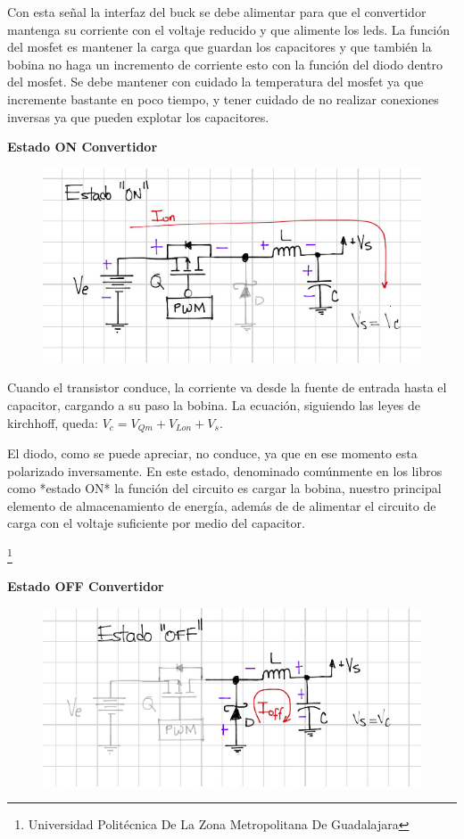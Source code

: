 \documentclass[11pt,a4paper]{article}
\begin{document}
Con esta señal la interfaz del buck se debe alimentar para que el convertidor mantenga su corriente con el voltaje reducido y que alimente los leds. La función del mosfet es mantener la carga que guardan los capacitores y que también la bobina no haga un incremento de corriente esto con la función del diodo dentro del mosfet. Se debe mantener con cuidado la temperatura del mosfet ya que incremente bastante en poco tiempo, y tener cuidado de no realizar conexiones inversas ya que pueden explotar los capacitores.

\textbf{Estado ON Convertidor}

\begin{figure}[hbtp]
\centering
\includegraphics[scale=0.50]{ON.png}
\end{figure} 

Cuando el transistor conduce, la corriente va desde la fuente de entrada hasta el capacitor, cargando a su paso la bobina. La ecuación, siguiendo las leyes de kirchhoff, queda: $ V_c = V_{Qm} + V_{Lon} + V_s $.


El diodo, como se puede apreciar, no conduce, ya que en ese momento esta polarizado inversamente. En este estado, denominado comúnmente en los libros como *estado ON* la función del circuito es cargar la bobina, nuestro principal elemento de almacenamiento de energía, además de  de alimentar el circuito de carga con el voltaje suficiente por medio del capacitor.


\footnote{Universidad Politécnica De La Zona Metropolitana De Guadalajara} 

\newpage

\textbf{Estado OFF  Convertidor}

\begin{figure}[hbtp]
\centering
\includegraphics[scale=0.50]{OFF.png}
\end{figure} 
\end{document}
